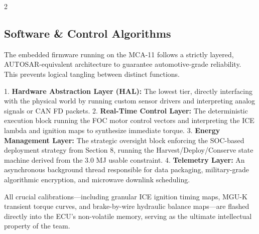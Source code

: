 \begin{multicols}{2}
\subsection{Software \& Control Algorithms}

The embedded firmware running on the MCA-11 follows a strictly layered, AUTOSAR-equivalent architecture to guarantee automotive-grade reliability. This prevents logical tangling between distinct functions. 

1. \textbf{Hardware Abstraction Layer (HAL):} The lowest tier, directly interfacing with the physical world by running custom sensor drivers and interpreting analog signals or CAN FD packets.
2. \textbf{Real-Time Control Layer:} The deterministic execution block running the FOC motor control vectors and interpreting the ICE lambda and ignition maps to synthesize immediate torque.
3. \textbf{Energy Management Layer:} The strategic oversight block enforcing the SOC-based deployment strategy from Section 8, running the Harvest/Deploy/Conserve state machine derived from the 3.0 MJ usable constraint.
4. \textbf{Telemetry Layer:} An asynchronous background thread responsible for data packaging, military-grade algorithmic encryption, and microwave downlink scheduling.

All crucial calibrations—including granular ICE ignition timing maps, MGU-K transient torque curves, and brake-by-wire hydraulic balance maps—are flashed directly into the ECU's non-volatile memory, serving as the ultimate intellectual property of the team.
\end{multicols}
